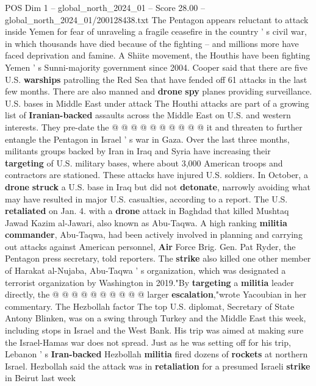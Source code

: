 \begin{textsample}{POS Dim 1 – global\_north\_2024\_01 – Score 28.00 – global\_north\_2024\_01/200128438.txt}
The Pentagon appears reluctant to attack inside Yemen for fear of unraveling a fragile ceasefire in the country ' s civil war, in which thousands have died because of the fighting -- and millions more have faced deprivation and famine.
A Shiite movement, the Houthis have been fighting Yemen ' s Sunni-majority government since 2004.
Cooper said that there are five U.S. \textbf{warships} patrolling the Red Sea that have fended off 61 attacks in the last few months.
There are also manned and \textbf{drone} \textbf{spy} planes providing surveillance.
U.S. bases in Middle East under attack The Houthi attacks are part of a growing list of \textbf{Iranian-backed} assaults across the Middle East on U.S. and western interests.
They pre-date the @ @ @ @ @ @ @ @ @ @ it and threaten to further entangle the Pentagon in Israel ' s war in Gaza.
Over the last three months, militants groups backed by Iran in Iraq and Syria have increasing their \textbf{targeting} of U.S. military bases, where about 3,000 American troops and contractors are stationed.
These attacks have injured U.S. soldiers.
In October, a \textbf{drone} \textbf{struck} a U.S. base in Iraq but did not \textbf{detonate}, narrowly avoiding what may have resulted in major U.S. casualties, according to a report.
The U.S. \textbf{retaliated} on Jan. 4. with a \textbf{drone} attack in Baghdad that killed Mushtaq Jawad Kazim al-Jawari, also known as Abu-Taqwa.
A high ranking \textbf{militia} \textbf{commander}, Abu-Taqwa, had been actively involved in planning and carrying out attacks against American personnel, \textbf{Air} Force Brig.
Gen.
Pat Ryder, the Pentagon press secretary, told reporters.
The \textbf{strike} also killed one other member of Harakat al-Nujaba, Abu-Taqwa ' s organization, which was designated a terrorist organization by Washington in 2019."By \textbf{targeting} a \textbf{militia} leader directly, the @ @ @ @ @ @ @ @ @ @ larger \textbf{escalation},"wrote Yacoubian in her commentary.
The Hezbollah factor The top U.S. diplomat, Secretary of State Antony Blinken, was on a swing through Turkey and the Middle East this week, including stops in Israel and the West Bank.
His trip was aimed at making sure the Israel-Hamas war does not spread.
Just as he was setting off for his trip, Lebanon ' s \textbf{Iran-backed} Hezbollah \textbf{militia} fired dozens of \textbf{rockets} at northern Israel.
Hezbollah said the attack was in \textbf{retaliation} for a presumed Israeli \textbf{strike} in Beirut last week

\end{textsample}
